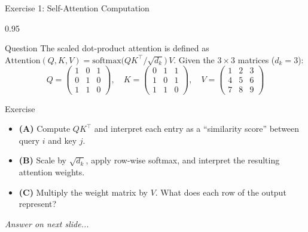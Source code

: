 \documentclass[9pt, aspectratio=169, t]{beamer}
\begin{document}
\begin{frame}{Exercise 1: Self-Attention Computation}
    \begin{cminipage}{0.95\textwidth}
    {\small
    \begin{alertblock}{Question}
        The scaled dot-product attention is defined as
        $\text{Attention}(Q,K,V) = \text{softmax}\!\bigl(QK^\top / \sqrt{d_k}\bigr)\,V$.
        Given the $3\times 3$ matrices ($d_k = 3$):
        \[
            Q = \begin{pmatrix} 1 & 0 & 1 \\ 0 & 1 & 0 \\ 1 & 1 & 0 \end{pmatrix},\quad
            K = \begin{pmatrix} 0 & 1 & 1 \\ 1 & 0 & 1 \\ 1 & 1 & 0 \end{pmatrix},\quad
            V = \begin{pmatrix} 1 & 2 & 3 \\ 4 & 5 & 6 \\ 7 & 8 & 9 \end{pmatrix}
        \]
    \end{alertblock}

    \vspace{0.1cm}

    \begin{block}{Exercise}
        \begin{itemize}\setlength{\itemsep}{3pt}
            \item \textcolor{MainBlue}{\textbf{(A)}} Compute $QK^\top$ and interpret each entry as a ``similarity score'' between query $i$ and key $j$.
            \item \textcolor{MainBlue}{\textbf{(B)}} Scale by $\sqrt{d_k}$, apply row-wise softmax, and interpret the resulting attention weights.
            \item \textcolor{MainBlue}{\textbf{(C)}} Multiply the weight matrix by $V$. What does each row of the output represent?
        \end{itemize}
    \end{block}

    \vspace{0.1cm}

    \begin{center}
        \textit{Answer on next slide...}
    \end{center}
    }
    \end{cminipage}
\end{frame}
\end{document}
